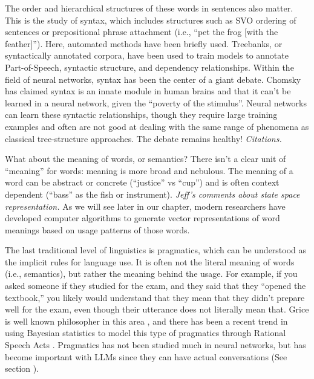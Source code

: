 The order and hierarchical structures of these words in sentences also matter. This is the study of syntax, which includes structures such as SVO ordering of sentences or prepositional phrase attachment (i.e., ``pet the frog [with the feather]'').
Here, automated methods have been briefly used. Treebanks, or syntactically annotated corpora, have been used to train models to annotate Part-of-Speech, syntactic structure, and dependency relationships.
Within the field of neural networks, syntax has been the center of a giant debate. Chomsky has claimed syntax is an innate module in human brains and that it can't be learned in a neural network, given the ``poverty of the stimulus''. Neural networks can learn these syntactic relationships, though they require large training examples and often are not good at dealing with the same range of phenomena as classical tree-structure approaches. The debate remains healthy! \textit{Citations.}

What about the meaning of words, or semantics? There isn't a clear unit of ``meaning'' for words: meaning is more broad and nebulous. The meaning of a word can be abstract or concrete (``justice'' vs ``cup'') and is often context dependent (``bass'' as the fish or instrument).
\textit{Jeff's comments about state space representation.}
As we will see later in our chapter, modern researchers have developed computer algorithms to generate vector representations of word meanings based on usage patterns of those words.

The last traditional level of linguistics is pragmatics, which can be understood as the implicit rules for language use. It is often not the literal meaning of words (i.e., semantics), but rather the meaning behind the usage. For example, if you asked someone if they studied for the exam, and they said that they ``opened the textbook,'' you likely would understand that they mean that they didn't prepare well for the exam, even though their utterance does not literally mean that. Grice is well known philosopher in this area \cite{grice1957meaning, grice1975logic}, and there has been a recent trend in using Bayesian statistics to model this type of pragmatics through Rational Speech Acts \cite{goodman2016pragmatic}. Pragmatics has not been studied much in neural networks, but has become important with LLMs since they can have actual conversations (See section ).

